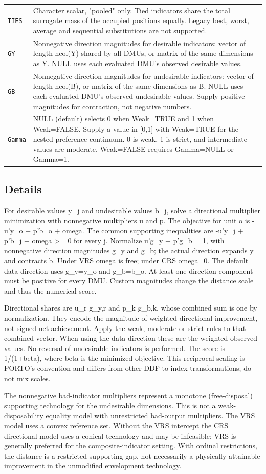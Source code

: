 \documentclass[10pt,a4paper]{article}
\newcommand{\field}[1]{\needspace{3\baselineskip}\subsection*{#1}}
\begin{document}
\begin{longtable}{@{}p{53mm}p{106mm}@{}}
\texttt{TIES} & Character scalar, "pooled" only. Tied indicators share the total surrogate mass of the occupied positions equally. Legacy best, worst, average and sequential substitutions are not supported. \\[2pt]
\texttt{GY} & Nonnegative direction magnitudes for desirable indicators: vector of length ncol(Y) shared by all DMUs, or matrix of the same dimensions as Y. NULL uses each evaluated DMU's observed desirable values. \\[2pt]
\texttt{GB} & Nonnegative direction magnitudes for undesirable indicators: vector of length ncol(B), or matrix of the same dimensions as B. NULL uses each evaluated DMU's observed undesirable values. Supply positive magnitudes for contraction, not negative numbers. \\[2pt]
\texttt{Gamma} & NULL (default) selects 0 when Weak=TRUE and 1 when Weak=FALSE. Supply a value in [0,1] with Weak=TRUE for the nested preference continuum. 0 is weak, 1 is strict, and intermediate values are moderate. Weak=FALSE requires Gamma=NULL or Gamma=1. \\[2pt]
\end{longtable}
\field{Details}
For desirable values y\_j and undesirable values b\_j, solve a directional multiplier minimization with nonnegative multipliers u and p. The objective for unit o is -u'y\_o + p'b\_o + omega. The common supporting inequalities are -u'y\_j + p'b\_j + omega \textgreater{}= 0 for every j. Normalize u'g\_y + p'g\_b = 1, with nonnegative direction magnitudes g\_y and g\_b; the actual direction expands y and contracts b. Under VRS omega is free; under CRS omega=0. The default data direction uses g\_y=y\_o and g\_b=b\_o. At least one direction component must be positive for every DMU. Custom magnitudes change the distance scale and thus the numerical score.

Directional shares are u\_r g\_y,r and p\_k g\_b,k, whose combined sum is one by normalization. They encode the magnitude of weighted directional improvement, not signed net achievement. Apply the weak, moderate or strict rules to that combined vector. When using the data direction these are the weighted observed values. No reversal of undesirable indicators is performed. The score is 1/(1+beta), where beta is the minimized objective. This reciprocal scaling is PORTO's convention and differs from other DDF-to-index transformations; do not mix scales.

The nonnegative bad-indicator multipliers represent a monotone (free-disposal) supporting technology for the undesirable dimensions. This is not a weak-disposability equality model with unrestricted bad-output multipliers. The VRS model uses a convex reference set. Without the VRS intercept the CRS directional model uses a conical technology and may be infeasible; VRS is generally preferred for the composite-indicator setting. With ordinal restrictions, the distance is a restricted supporting gap, not necessarily a physically attainable improvement in the unmodified envelopment technology.
\end{document}
